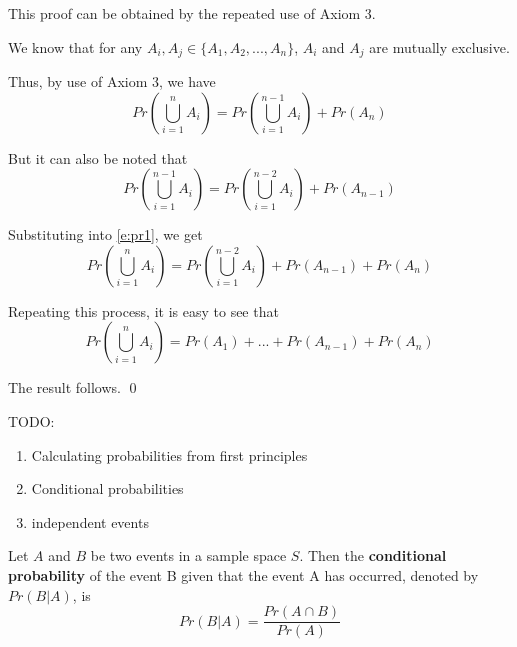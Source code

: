 \begin{prf}
This proof can be obtained by the repeated use of Axiom 3.

We know that for any $A_i, A_j \in \{A_1, A_2, ... , A_n\}$,
$A_i$ and $A_j$ are mutually exclusive.

Thus, by use of Axiom 3, we have 
\begin{equation} \label{e:pr1}
Pr\left(\bigcup _{i=1} ^n A_i\right) = Pr\left(\bigcup _{i=1} ^{n-1} A_i\right) + Pr(A_n)
\end{equation}

But it can also be noted that 
\begin{equation}
Pr\left(\bigcup _{i=1} ^{n-1} A_i\right) = Pr\left(\bigcup _{i=1} ^{n-2} A_i\right) + Pr(A_{n-1})
\end{equation}

Substituting into \ref{e:pr1}, we get
\begin{equation} \label{e:pr1}
Pr\left(\bigcup _{i=1} ^n A_i\right) = Pr\left(\bigcup _{i=1} ^{n-2} A_i\right) + Pr(A_{n-1}) + Pr(A_n)
\end{equation}

Repeating this process, it is easy to see that
\begin{equation} 
Pr\left(\bigcup _{i=1} ^n A_i\right) = Pr(A_{1}) + ... + Pr(A_{n-1}) + Pr(A_n)
\end{equation}

The result follows. \qed

\end{prf}


TODO: 
\begin{enumerate}
\item Calculating probabilities from first principles
\item Conditional probabilities
\item independent events
\end{enumerate}

\begin{defn}
Let $A$ and $B$ be two events in a sample space $S$. Then the 
\textbf{conditional probability} of the event B given that the event A has
occurred, denoted by $Pr(B|A)$, is
\begin{equation}
Pr(B|A) = \frac{Pr(A \cap B)}{Pr(A)}
\end{equation}
\end{defn}

